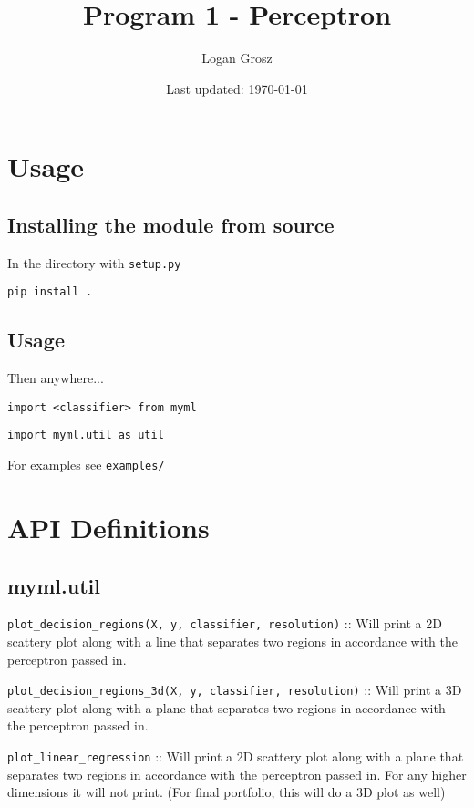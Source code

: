 \documentclass{article}
\title{Program 1 - Perceptron}
\author{Logan Grosz}
\date{Last updated: \today}
\begin{document}
\maketitle

\tableofcontents

\newpage

\section{Usage}

\subsection{Installing the module from source}

In the directory with \texttt{setup.py}

\texttt{pip install .}

\subsection{Usage}

Then anywhere...

\texttt{import <classifier> from myml}

\texttt{import myml.util as util}

For examples see \texttt{examples/}

\section{API Definitions}

\subsection{myml.util}

\texttt{plot\_decision\_regions(X, y, classifier, resolution)} :: Will print a 2D scattery plot along with a
line that separates two regions in accordance with the perceptron passed in.

\texttt{plot\_decision\_regions\_3d(X, y, classifier, resolution)} :: Will print a 3D scattery plot along with a
plane that separates two regions in accordance with the perceptron passed in.

\texttt{plot\_linear\_regression} :: Will print a 2D scattery plot along with a
plane that separates two regions in accordance with the perceptron passed in. For any higher dimensions it will not print. (For final portfolio, this will do a 3D plot as well)
\end{document}
